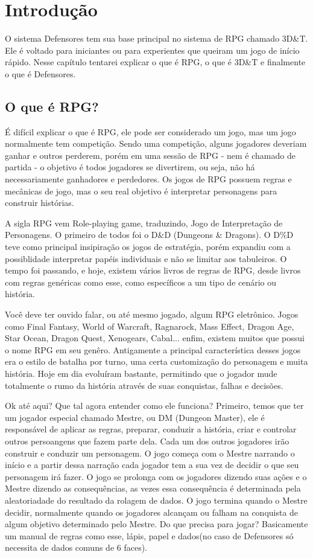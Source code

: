 \chapter{Introdução}
\label{ch:introduction}

O sistema Defensores tem sua base principal no sistema de RPG chamado 3D\&T. Ele é voltado para iniciantes ou para experientes que queiram um jogo de início rápido. Nesse capítulo tentarei explicar o que é RPG, o que é 3D\&T e finalmente o que é Defensores. 

\section{O que é RPG?}

É difícil explicar o que é RPG, ele pode ser considerado um jogo, mas um jogo normalmente tem competição. Sendo uma competição, alguns jogadores deveriam ganhar e outros perderem, porém em uma sessão de RPG - nem é chamado de partida - o objetivo é todos jogadores se divertirem, ou seja, não há necessariamente ganhadores e perdedores. Os jogos de RPG possuem regras e mecânicas de jogo, mas o seu real objetivo é interpretar personagens para construir histórias. 

A sigla RPG vem Role-playing game, traduzindo, Jogo de Interpretação de Personagens. O primeiro de todos foi o D\&D (Dungeons \& Dragons). O D\%D  teve como principal insipiração os jogos de estratégia, porém expandiu com a possiblidade interpretar papéis individuais e não se limitar aos tabuleiros. O tempo foi passando, e hoje, existem vários livros de regras de RPG, desde livros com regras genéricas como esse, como específicos a um tipo de cenário ou história.

Você deve ter ouvido falar, ou até mesmo jogado, algum RPG eletrônico. Jogos como Final Fantasy, World of Warcraft, Ragnarock, Mass Effect, Dragon Age, Star Ocean, Dragon Quest, Xenogears, Cabal... enfim, existem muitos que possui o nome RPG em seu genêro. Antigamente a principal característica desses jogos era o estilo de batalha por turno, uma certa customização do personagem e muita história. Hoje em dia evoluíram bastante, permitindo que o jogador mude totalmente o rumo da história através de suas conquistas, falhas e decisões.

Ok até aqui? Que tal agora entender como ele funciona? Primeiro, temos que ter um jogador especial chamado Mestre, ou DM (Dungeon Master), ele é responsável de aplicar as regras, preparar, conduzir a história, criar e controlar outros persoangens que fazem parte dela. Cada um dos outros jogadores irão construir e conduzir um personagem. O jogo começa com o Mestre narrando o início e a partir dessa narração cada jogador tem a sua vez de decidir o que seu personagem irá fazer. O jogo se prolonga com os jogadores dizendo suas ações e o Mestre dizendo as consequências, as vezes essa consequência é determinada pela aleatoriadade do resultado da rolagem de dados. O jogo termina quando o Mestre decidir, normalmente quando os jogadores alcançam ou falham na conquista de algum objetivo determinado pelo Mestre. Do que precisa para jogar? Basicamente um manual de regras como esse, lápis, papel e dados(no caso de Defensores só necessita de dados comuns de 6 faces).

